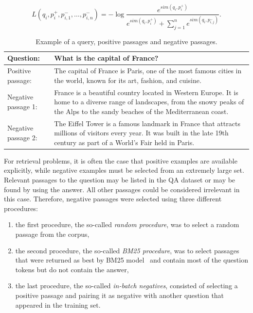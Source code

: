 \begin{equation}
    L(q_i, p_i^+, p_{i,1}^-, \dots , p_{i,n}^-) = -\operatorname{log}\frac{e^{sim(q_i,p_i^+)}}{e^{sim(q_i,p_i^+)}+\sum_{j=1}^n e^{sim(q_i,p_{i,j}^-)}}. \label{eq:dpr}
\end{equation}

\begin{table}[h]
    \centering
    \begin{tabular}{lp{7cm}}
        \hline
        Question: &  What is the capital of France? \\
        \hline
        Positive passage: & The capital of France is Paris, one of the most famous cities in the world, known for its art, fashion, and cuisine. \\
        \hline
        Negative passage 1: & France is a beautiful country located in Western Europe. It is home to a diverse range of landscapes, from the snowy peaks of the Alps to the sandy beaches of the Mediterranean coast. \\
        \hline
        Negative passage 2: & The Eiffel Tower is a famous landmark in France that attracts millions of visitors every year. It was built in the late 19th century as part of a World's Fair held in Paris. \\
        \hline
    \end{tabular}
    \caption{Example of a query, positive passages and negative passages.}
    \label{tab:dpr}
\end{table}

For retrieval problems, it is often the case that positive examples are available explicitly, while negative examples must be selected from an extremely large set. Relevant passages to the question may be listed in the QA dataset or may be found by using the answer. All other passages could be considered irrelevant in this case. Therefore, negative passages were selected using three different procedures:
\begin{enumerate}
    \item the first procedure, the so-called \emph{random procedure}, was to select a random passage from the corpus,
    \item the second procedure, the so-called \emph{BM25 procedure}, was to select passages that were returned as best by BM25 model~\cite{BM25} and contain most of the question tokens but do not contain the answer,
    \item the last procedure, the so-called \emph{in-batch negatives}, consisted of selecting a positive passage and pairing it as negative with another question that appeared in the training set.
\end{enumerate}

